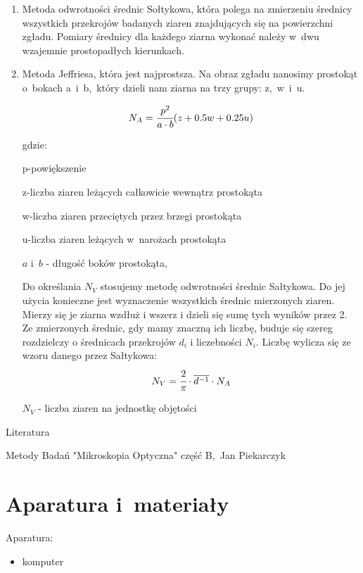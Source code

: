\documentclass[a4paper,12pt]{article}
\begin{document}
\begin{enumerate}
    \item Metoda odwrotności średnic Sołtykowa, która polega na zmierzeniu średnicy wszystkich przekrojów badanych ziaren znajdujących się na powierzchni zgładu. Pomiary średnicy dla każdego ziarna wykonać należy  w~dwu wzajemnie prostopadłych kierunkach.
    \newpage
    \item Metoda Jeffriesa, która jest najprostsza. Na obraz zgładu nanosimy prostokąt o~bokach a~i~b,~który dzieli nam ziarna na trzy grupy: z,~w~i~u.{\color{blue} 
    
    $$N_A=\cfrac{p^2}{a\cdot b}(z+0.5w+0.25u)$$
    
    gdzie: 
    
    p-powiększenie
    
    z-liczba ziaren leżących całkowicie wewnątrz prostokąta
    
    w-liczba ziaren przeciętych przez brzegi prostokąta 
    
    u-liczba ziaren leżących w~narożach prostokąta
    
    $a$ i~$b$ - długość boków prostokąta,
    
    } 
    
   {\color{blue} Do określania $N_V$ stosujemy metodę odwrotności średnic Sałtykowa. Do jej użycia konieczne jest wyznaczenie wszystkich średnic mierzonych ziaren. Mierzy się je ziarna wzdłuż i wszerz i dzieli się sumę tych wyników przez 2. Ze zmierzonych średnic, gdy mamy znaczną ich liczbę, buduje się szereg rozdzielczy o średnicach przekrojów $d_i$ i liczebności $N_i$. Liczbę wylicza się ze wzoru danego przez Sałtykowa: 
   $$N_V=\cfrac{2}{\pi}\cdot \overline{d^{-1}} \cdot N_A$$
   
   $N_V$ - liczba ziaren na jednostkę objętości
   }
   \newline
   
   
\end{enumerate}


Literatura

Metody Badań "Mikroskopia Optyczna" część B,~Jan Piekarczyk

\newpage

\section{Aparatura i~materiały}

Aparatura:
\begin{itemize}
    \item komputer
\end{itemize}
\end{document}
